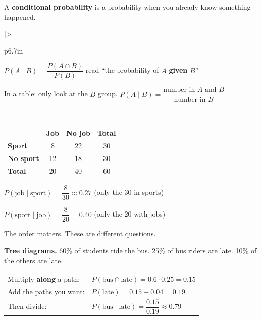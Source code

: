 \documentclass[11pt]{article}
\begin{document}

A \textbf{conditional probability} is a probability when you already know something happened.

\vspace{0.4em}
\renewcommand{\arraystretch}{1.3}
\begin{tabular}{|>{\raggedright\arraybackslash}p{6.7in}|}\hline
\rule{0pt}{2.4em}$P(A \mid B) = \dfrac{P(A \cap B)}{P(B)}$ \qquad read ``the probability of $A$ \textbf{given} $B$''\par\vspace{0.3em}
In a table: only look at the $B$ group. \qquad $P(A \mid B) = \dfrac{\text{number in } A \text{ and } B}{\text{number in } B}$\rule[-1.2em]{0pt}{0pt}\\ \hline
\end{tabular}

\vspace{0.6em}
\begin{minipage}[c]{0.4\linewidth}
\renewcommand{\arraystretch}{1.4}
\begin{tabular}{|l|c|c|c|}\hline
 & \textbf{Job} & \textbf{No job} & \textbf{Total} \\ \hline
\textbf{Sport} & 8 & 22 & 30 \\ \hline
\textbf{No sport} & 12 & 18 & 30 \\ \hline
\textbf{Total} & 20 & 40 & 60 \\ \hline
\end{tabular}
\end{minipage}\hfill
\begin{minipage}[c]{0.56\linewidth}
$P(\text{job} \mid \text{sport}) = \dfrac{8}{30} \approx 0.27$ \quad (only the 30 in sports)

\vspace{0.6em}
$P(\text{sport} \mid \text{job}) = \dfrac{8}{20} = 0.40$ \quad (only the 20 with jobs)

\vspace{0.4em}
The order matters. These are different questions.
\end{minipage}

\vspace{1em}
\textbf{Tree diagrams.} 60\% of students ride the bus. 25\% of bus riders are late. 10\% of the others are late.

\begin{center}\end{center}

\begin{tabular}{@{}ll}
Multiply \textbf{along} a path: & $P(\text{bus} \cap \text{late}) = 0.6 \cdot 0.25 = 0.15$\\
Add the paths you want: & $P(\text{late}) = 0.15 + 0.04 = 0.19$\\
Then divide: & $P(\text{bus} \mid \text{late}) = \dfrac{0.15}{0.19} \approx 0.79$\\
\end{tabular}
\end{document}

